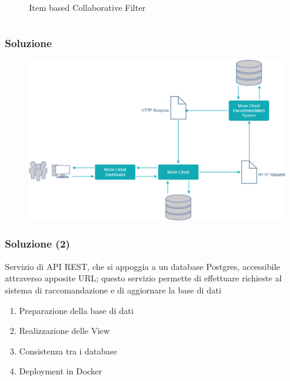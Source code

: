 \begin{frame}
\begin{columns}
\begin{column}{0.5\textwidth}
\begin{figure}
                \caption{Item based Collaborative Filter}
            \end{figure}
        \end{column}
    \end{columns}
\end{frame}

\begin{frame}
    \frametitle{Soluzione}
    \begin{figure}
        \centering
        \includegraphics[scale=0.42]{images/UML_MoonCloud_HowToDo}
    \end{figure}
\end{frame}

\begin{frame}
    \frametitle{Soluzione (2)}
    Servizio di API REST, che si appoggia a un database Postgres, accessibile 
    attraverso apposite URL; questo servizio permette di effettuare richieste al sistema di raccomandazione e di aggiornare la base di dati
    \begin{enumerate}
        \item Preparazione della base di dati
        \item Realizzazione delle View
        \item Consistenza tra i database
        \item Deployment in Docker
    \end{enumerate}
\end{frame}








